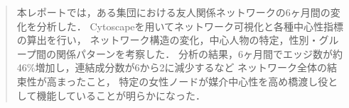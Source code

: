 \begin{abstract}
本レポートでは，ある集団における友人関係ネットワークの6ヶ月間の変化を分析した．
Cytoscapeを用いてネットワーク可視化と各種中心性指標の算出を行い，
ネットワーク構造の変化，中心人物の特定，性別・グループ間の関係パターンを考察した．
分析の結果，6ヶ月間でエッジ数が約46\%増加し，連結成分数が6から2に減少するなど
ネットワーク全体の結束性が高まったこと，
特定の女性ノードが媒介中心性を高め橋渡し役として機能していることが明らかになった．
\end{abstract}
